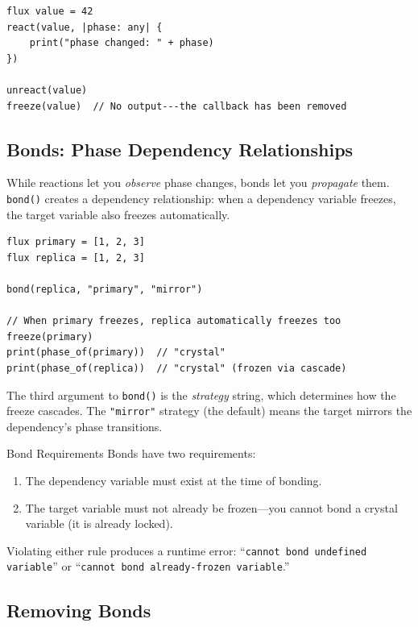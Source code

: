 \begin{lstlisting}[language=Lattice, caption={Removing all reactions}]
flux value = 42
react(value, |phase: any| {
    print("phase changed: " + phase)
})

unreact(value)
freeze(value)  // No output---the callback has been removed
\end{lstlisting}

\subsection{Bonds: Phase Dependency Relationships}


While reactions let you \emph{observe} phase changes, bonds let you \emph{propagate} them.
\lstinline|bond()| creates a dependency relationship: when a dependency variable freezes, the target variable also freezes automatically.

\begin{lstlisting}[language=Lattice, caption={Creating a bond between variables}]
flux primary = [1, 2, 3]
flux replica = [1, 2, 3]

bond(replica, "primary", "mirror")

// When primary freezes, replica automatically freezes too
freeze(primary)
print(phase_of(primary))  // "crystal"
print(phase_of(replica))  // "crystal" (frozen via cascade)
\end{lstlisting}

The third argument to \lstinline|bond()| is the \emph{strategy} string, which determines how the freeze cascades.
The \lstinline|"mirror"| strategy (the default) means the target mirrors the dependency's phase transitions.

\begin{notebox}{Bond Requirements}
Bonds have two requirements:
\begin{enumerate}
  \item The dependency variable must exist at the time of bonding.
  \item The target variable must not already be frozen---you cannot bond a crystal variable (it is already locked).
\end{enumerate}
Violating either rule produces a runtime error: ``\texttt{cannot bond undefined variable}'' or ``\texttt{cannot bond already-frozen variable}.''
\end{notebox}

\subsection{Removing Bonds}

